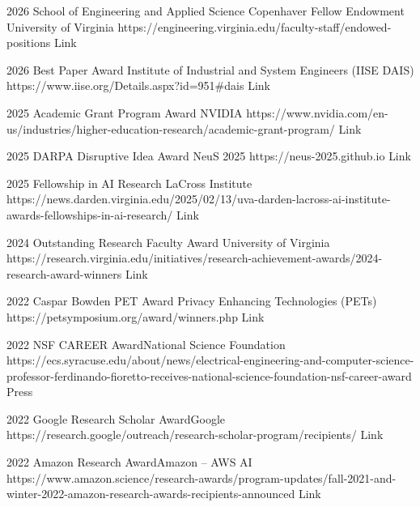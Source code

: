\documentclass[localFont,alternative]{documentMETADATA}
\begin{document}
\vspace{-6pt}
\vspace{-6pt}

\begin{awards}
	\awardentry
	{2026}
	{School of Engineering and Applied Science Copenhaver Fellow Endowment} 
	{University of Virginia}
	{https://engineering.virginia.edu/faculty-staff/endowed-positions}
	{Link}

	\awardentry
	{2026}
	{Best Paper Award}
	{Institute of Industrial and System Engineers (IISE DAIS)}
	{https://www.iise.org/Details.aspx?id=951\#dais}
	{Link}

	\awardentry
	{2025}
	{Academic Grant Program Award}
	{NVIDIA}
	{https://www.nvidia.com/en-us/industries/higher-education-research/academic-grant-program/}
	{Link}

	\awardentry
	{2025}
	{DARPA Disruptive Idea Award}%
	{NeuS 2025}
	{https://neus-2025.github.io}
	{Link}
	
	\awardentry
	{2025}
	{Fellowship in AI Research}
	{LaCross Institute}%
	{https://news.darden.virginia.edu/2025/02/13/uva-darden-lacross-ai-institute-awards-fellowships-in-ai-research/}
	{Link}
	
	\awardentry
	{2024}
	{Outstanding Research Faculty Award}
	{University of Virginia}%
	{https://research.virginia.edu/initiatives/research-achievement-awards/2024-research-award-winners}
	{Link}

	\awardentry
	{2022}
	{Caspar Bowden PET Award}%
	{Privacy Enhancing Technologies (PETs)}
	{https://petsymposium.org/award/winners.php}
	{Link}

	\awardentry
	{2022}
	{NSF CAREER Award}{National Science Foundation}
	{https://ecs.syracuse.edu/about/news/electrical-engineering-and-computer-science-professor-ferdinando-fioretto-receives-national-science-foundation-nsf-career-award}
	{Press}

	\awardentry
	{2022}
	{Google Research Scholar Award}{Google}
	{https://research.google/outreach/research-scholar-program/recipients/}
	{Link}

	\awardentry
	{2022}
	{Amazon Research Award}{Amazon -- AWS AI}
	{https://www.amazon.science/research-awards/program-updates/fall-2021-and-winter-2022-amazon-research-awards-recipients-announced}
	{Link}


\end{awards}
\end{document}
